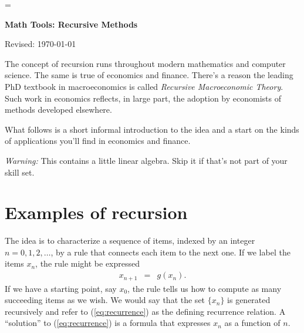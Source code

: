 \documentclass[11pt]{article}
\begin{document}
\parskip=\bigskipamount
\parindent=0.0in
\thispagestyle{empty}


\bigskip\bigskip
\centerline{\Large \bf Math Tools:  Recursive Methods}
\centerline{Revised: \today}

\bigskip
The concept of recursion runs throughout modern mathematics and computer science.
The same is true of economics and finance.
There's a reason the leading PhD textbook in macroeconomics
is called {\it Recursive Macroeconomic Theory\/}.
Such work in economics reflects, in large part, the adoption by economists of methods
developed elsewhere.

What follows is a short informal introduction to the idea and a start
on the kinds of applications you'll find in economics and finance.

{\it Warning:\/}
This contains a little linear algebra.
Skip it if that's not part of your skill set.


\section{Examples of recursion}

The idea is to characterize a sequence of items, indexed by an integer $n=0,1,2,\ldots$,
by a rule that connects each item to the next one.
If we label the items $x_n$, the rule might be expressed
\begin{eqnarray}
    x_{n+1} &=& g (x_n) .
    \label{eq:recurrence}
\end{eqnarray}
If we have a starting point, say $x_0$, the rule tells us how to compute
as many succeeding items as we wish.
We would say that the set $\{x_n\}$ is generated recursively
and refer to (\ref{eq:recurrence}) as the defining recurrence relation.
A ``solution'' to (\ref{eq:recurrence}) is a formula
that expresses $x_n$ as a function of $n$.
\end{document}
